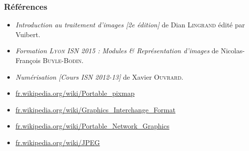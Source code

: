 \documentclass[handout]{beamer}
\begin{document}
\begin{frame}
	\frametitle{Références}

	\begin{itemize}
		\item \textit{\og{}Introduction au traitement d'images [2\textup{e} édition]\fg{}} de Dian \textsc{Lingrand} édité par Vuibert.

		\item \textit{\og{}Formation \textsc{\textit{Lyon}} ISN 2015 : Modules \& Représentation d'images\fg{}} de Nicolas-François \textsc{Buyle-Bodin}.

		\item \textit{\og{}Numérisation [Cours ISN 2012-13]\fg{}} de Xavier \textsc{Ouvrard}.
		
		\item \url{fr.wikipedia.org/wiki/Portable_pixmap}
		
		\item \url{fr.wikipedia.org/wiki/Graphics_Interchange_Format}
		
		\item \url{fr.wikipedia.org/wiki/Portable_Network_Graphics}
		
		\item \url{fr.wikipedia.org/wiki/JPEG}
	\end{itemize}
\end{frame}
\end{document}
